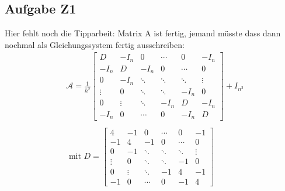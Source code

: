 \subsection*{Aufgabe Z1}
Hier fehlt noch die Tipparbeit: Matrix A ist fertig, jemand müsste dass dann nochmal als Gleichungssystem fertig ausschreiben:
\begin{align*}
&\mathcal{A}=\frac{1}{h^2} \begin{bmatrix}
D & -I_n & 0 & \cdots & 0 & -I_n\\
-I_n & D & -I_n & 0 & \cdots & 0\\
0 & -I_n& \ddots & \ddots & \ddots &\vdots\\
\vdots & 0 & \ddots& \ddots & -I_n & 0\\
0 & \vdots & \ddots & -I_n & D & -I_n\\
-I_n & 0 & \cdots & 0 & -I_n & D
\end{bmatrix} + I_{n^2}\\\\
&\text{ mit } D=\begin{bmatrix}
4 & -1 & 0 & \cdots & 0 & -1\\
-1 & 4 & -1 & 0 &\cdots & 0\\
0 & -1 & \ddots & \ddots & \ddots & \vdots\\
\vdots & 0 & \ddots & \ddots &-1 & 0\\
0 & \vdots & \ddots & -1 & 4 & -1\\
-1 & 0 & \cdots & 0 & -1 & 4
\end{bmatrix}
\end{align*}
